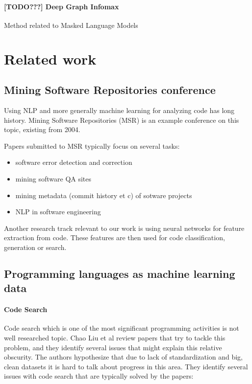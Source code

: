 \documentclass[11pt]{report}
\begin{document}
\subsubsection{[TODO???] Deep Graph Infomax}
Method related to Masked Language Models


\chapter{Related work}


\section{Mining Software Repositories conference}

Using NLP and more generally machine learning for analyzing code has long history. Mining Software Repositories (MSR) \cite{DBLP:conf/msr/2021} is an example conference on this topic, existing from 2004.

Papers submitted to MSR typically focus on several tasks:
\begin{itemize}
\item software error detection and correction
\item mining software QA sites
\item mining metadata (commit history et c) of sotware projects
\item NLP in software engineering
\end{itemize}

Another research track relevant to our work is using neural networks for feature extraction from code. These features are then used for code classification, generation or search.

\section{Programming languages as machine learning data}

\subsubsection{Code Search}
Code search which is one of the most significant programming activities is not well researched topic. Chao Liu et al \cite{code_search} review papers that try to tackle this problem, and they identify several issues that might explain this relative obscurity. The authors hypothesize that due to lack of standardization and big, clean datasets it is hard to talk about progress in this area. They identify several issues with code search that are typically solved by the papers:
\end{document}
